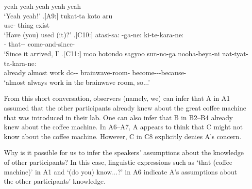            yeah yeah yeah yeah yeah \\
           `Yeah yeah!'
 \bg.[A9:] tukat-ta koto aru \\
        use- thing exist \\
        `Have (you) used (it)?'
 \bg.[C10:] atasi-sa: -ga-ne: ki-te-kara-ne: \\
         - that-- come-and-since- \\
         `Since it arrived, I'
 \bg.[C11:] moo hotondo sagyoo sun-no-ga nooha-beya-ni nat-tyat-ta-kara-ne: \\
           already almost work do-- brainwave-room- become---because- \\
           `almost always work in the brainwave room, so...'

From this short conversation,
observers (namely, we) can infer that
A in A1 assumed that the other participants already knew about the great coffee machine that was introduced in their lab.
One can also infer that B in B2--B4 already knew about the coffee machine.
In A6--A7,
A appears to think that C might not know about the coffee machine.
However, C in C8 explicitly denies A's concern. 

Why is it possible for us to infer the speakers' assumptions about the knowledge of other participants?
In this case, linguistic expressions such as
 `that (coffee machine)' in A1 and
 `(do you) know...?' in A6
indicate A's assumptions about the other participants' knowledge.

